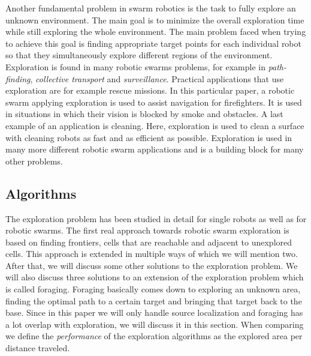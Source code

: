 
Another fundamental problem in swarm robotics is the task to fully explore an unknown environment.
The main goal is to minimize the overall exploration time while still exploring the whole environment. 
The main problem faced when trying to achieve this goal is finding appropriate target points for each individual robot so that they simultaneously explore different regions of the environment. \cite{burgard2005coordinated} \\
Exploration is found in many robotic swarms problems, for example in \emph{path-finding}, \emph{collective transport} and \emph{surveillance}.
Practical applications that use exploration are for example rescue missions. \cite{Naghsh2008,Penders2011}
In this particular paper, a robotic swarm applying exploration is used to assist navigation for firefighters.
It is used in situations in which their vision is blocked by smoke and obstacles. 
A last example of an application is cleaning. \cite{wagner2008cooperative}
Here, exploration is used to clean a surface with cleaning robots as fast and as efficient as possible. 
Exploration is used in many more different robotic swarm applications and is a building block for many other problems.

\subsection{Algorithms}
The exploration problem has been studied in detail for single robots \cite{lee1997quantitative,albers1999exploring} as well as for robotic swarms.
The first real approach towards robotic swarm exploration is based on finding frontiers, cells that are reachable and adjacent to unexplored cells. \cite{yamauchi1998frontier} This approach is extended in multiple ways of which we will mention two. \cite{solanas2004coordinated,sheng2006distributed}
After that, we will discuss some other solutions to the exploration problem. \cite{singh1993map,zlot2002multi}
We will also discuss three solutions to an extension of the exploration problem which is called foraging. \cite{jung2010multi,hoff2010two}
Foraging basically comes down to exploring an unknown area, finding the optimal path to a certain target and bringing that target back to the base.
Since in this paper we will only handle source localization and foraging has a lot overlap with exploration, we will discuss it in this section.
When comparing we define the \emph{performance} of the exploration algorithms as the explored area per distance traveled.

